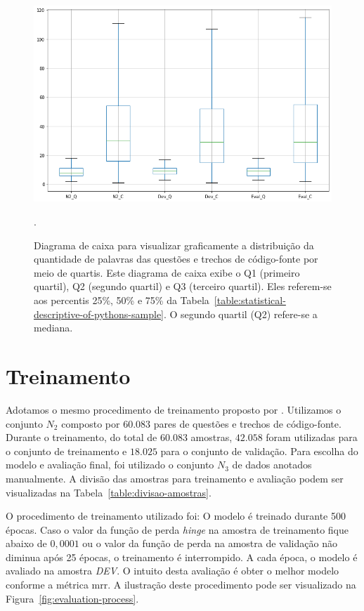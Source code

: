 \begin{figure}[h]
\centering
\includegraphics[width=1\textwidth]{figuras/cap-experimento/boxplot_number_of_words.png}
\caption{Diagrama de caixa para visualizar graficamente a distribuição da quantidade de palavras das questões e trechos de código-fonte por meio de quartis. Este diagrama de caixa exibe o Q1 (primeiro quartil), Q2 (segundo quartil) e Q3 (terceiro quartil). Eles referem-se aos percentis 25\%, 50\% e 75\% da Tabela~\ref{table:statistical-descriptive-of-pythons-sample}. O segundo quartil (Q2) refere-se a mediana. }. 
\label{fig:boxplot-number-of-words}
\end{figure}

\section{Treinamento}
\label{sec:treinamento}

Adotamos o mesmo procedimento de treinamento proposto por \cite{iyer-etal-2016-summarizing}. Utilizamos o conjunto $N_{2}$ composto por $60.083$ pares de questões e trechos de código-fonte. Durante o treinamento, do total de $60.083$ amostras, $42.058$ foram utilizadas para o conjunto de treinamento e $18.025$ para o conjunto de validação. Para escolha do modelo e avaliação final, foi utilizado o conjunto $N_{3}$ de dados anotados manualmente. A divisão das amostras para treinamento e avaliação podem ser visualizadas na Tabela~\ref{table:divisao-amostras}. 

O procedimento de treinamento utilizado foi: O modelo é treinado durante 500 épocas. Caso o valor da função de perda \textit{hinge} na amostra de treinamento fique abaixo de $0,0001$ ou o valor da função de perda na amostra de validação não diminua após 25 épocas, o treinamento é interrompido. A cada época, o modelo é avaliado na amostra \emph{DEV}. O intuito desta avaliação é obter o melhor modelo conforme a métrica \acrshort{mrr}. A ilustração deste procedimento pode ser visualizado na Figura~\ref{fig:evaluation-process}.

